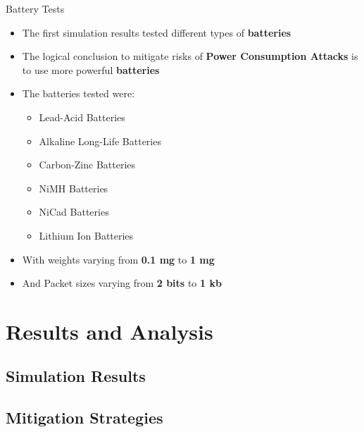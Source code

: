 \documentclass{beamer}
\begin{document}
\begin{frame}{Battery Tests}
\begin{itemize}
	\item The first simulation results tested different types of \textbf{batteries}
	\item The logical conclusion to mitigate risks of \textbf{Power Consumption Attacks} is to use more powerful \textbf{batteries}
	\item The batteries tested were: 
	\begin{itemize}
	  \item Lead-Acid Batteries
	  \item Alkaline Long-Life Batteries
	  \item Carbon-Zinc Batteries
	  \item NiMH Batteries
	  \item NiCad Batteries
	  \item Lithium Ion Batteries
	\end{itemize}
	\item With weights varying from \textbf{0.1 mg} to \textbf{1 mg}
	\item And Packet sizes varying from \textbf{2 bits} to \textbf{1 kb}
\end{itemize}
\end{frame}



\section{Results and Analysis}

\subsection{Simulation Results}

\subsection{Mitigation Strategies}
\end{document}
